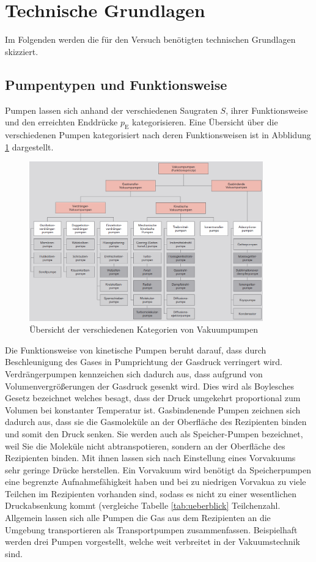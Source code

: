 \section{Technische Grundlagen}
Im Folgenden werden die für den Versuch benötigten technischen Grundlagen skizziert.
\subsection{Pumpentypen und Funktionsweise}
Pumpen lassen sich anhand der verschiedenen Saugraten $S$, ihrer Funktionsweise und den erreichten Enddrücke $p_\text{E}$ kategorisieren. Eine Übersicht über die verschiedenen Pumpen kategorisiert nach deren Funktionsweisen ist in Abblidung \ref{fig:Uebersicht} dargestellt.
\begin{figure}[htbp]
  \centering
  \includegraphics[width=0.9\textwidth]{picture/Uebersicht.png}
  \caption{Übersicht der verschiedenen Kategorien von Vakuumpumpen \cite{Uebersicht}}
  \label{fig:Uebersicht}
\end{figure}
Die Funktionsweise von kinetische Pumpen beruht darauf, dass durch Beschleunigung des Gases in Pumprichtung der Gasdruck verringert wird.
Verdrängerpumpen kennzeichen sich dadurch aus, dass aufgrund von Volumenvergrößerungen der Gasdruck gesenkt wird. Dies wird als Boylesches Gesetz bezeichnet welches besagt, dass der Druck umgekehrt proportional zum Volumen bei konstanter Temperatur ist.
Gasbindenende Pumpen zeichnen sich dadurch aus, dass sie die Gasmoleküle an der Oberfläche des Rezipienten binden und somit den Druck senken. Sie werden auch als Speicher-Pumpen bezeichnet, weil Sie die Moleküle nicht abtranspotieren, sondern an der Oberfläche des Rezipienten binden. Mit ihnen lassen sich nach Einstellung eines Vorvakuums sehr geringe Drücke herstellen. Ein Vorvakuum wird benötigt da Speicherpumpen eine begrenzte Aufnahmefähigkeit haben und bei zu niedrigen Vorvakua zu viele Teilchen im Rezipienten vorhanden sind, sodass es nicht zu einer wesentlichen Druckabsenkung kommt (vergleiche Tabelle \ref{tab:ueberblick} Teilchenzahl.
Allgemein lassen sich alle Pumpen die Gas aus dem Rezipienten an die Umgebung transportieren als Transportpumpen zusammenfassen.
Beispielhaft werden drei Pumpen vorgestellt, welche weit verbreitet in der Vakuumstechnik sind.
